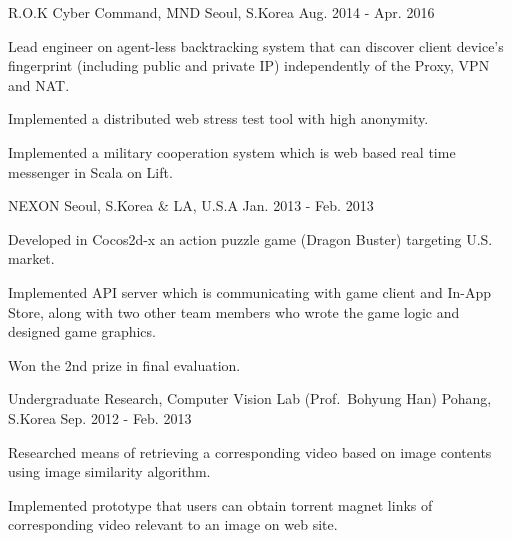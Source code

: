 \begin{cventries}
	{R.O.K Cyber Command, MND} %
	{Seoul, S.Korea} %
	{Aug. 2014 - Apr. 2016} %
	{
		\begin{cvitems} %
			\item {Lead engineer on agent-less backtracking system that can discover client device's fingerprint (including public and private IP) independently of the Proxy, VPN and NAT.}
			\item {Implemented a distributed web stress test tool with high anonymity.}
			\item {Implemented a military cooperation system which is web based real time messenger in Scala on Lift.}
		\end{cvitems}
	}

	{NEXON} %
	{Seoul, S.Korea \& LA, U.S.A} %
	{Jan. 2013 - Feb. 2013} %
	{
		\begin{cvitems} %
			\item {Developed in Cocos2d-x an action puzzle game (Dragon Buster) targeting U.S. market.}
			\item {Implemented API server which is communicating with game client and In-App Store, along with two other team members who wrote the game logic and designed game graphics.}
			\item {Won the 2nd prize in final evaluation.}
		\end{cvitems}
	}

	{Undergraduate Research, Computer Vision Lab (Prof.\ Bohyung Han)} %
	{Pohang, S.Korea} %
	{Sep. 2012 - Feb. 2013} %
	{
		\begin{cvitems} %
			\item {Researched means of retrieving a corresponding video based on image contents using image similarity algorithm.}
			\item {Implemented prototype that users can obtain torrent magnet links of corresponding video relevant to an image on web site.}
		\end{cvitems}
	}


\end{cventries}
